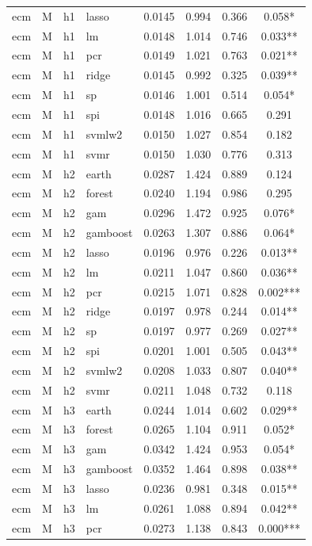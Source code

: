 \begin{ThreePartTable}
\begin{longtable}[t]{llclcccc}
ecm & M & h1 & lasso & 0.0145 & 0.994 & 0.366 & 0.058*\\
ecm & M & h1 & lm & 0.0148 & 1.014 & 0.746 & 0.033**\\
ecm & M & h1 & pcr & 0.0149 & 1.021 & 0.763 & 0.021**\\
ecm & M & h1 & ridge & 0.0145 & 0.992 & 0.325 & 0.039**\\
ecm & M & h1 & sp & 0.0146 & 1.001 & 0.514 & 0.054*\\
ecm & M & h1 & spi & 0.0148 & 1.016 & 0.665 & 0.291\\
ecm & M & h1 & svmlw2 & 0.0150 & 1.027 & 0.854 & 0.182\\
ecm & M & h1 & svmr & 0.0150 & 1.030 & 0.776 & 0.313\\
\addlinespace
ecm & M & h2 & earth & 0.0287 & 1.424 & 0.889 & 0.124\\
ecm & M & h2 & forest & 0.0240 & 1.194 & 0.986 & 0.295\\
ecm & M & h2 & gam & 0.0296 & 1.472 & 0.925 & 0.076*\\
ecm & M & h2 & gamboost & 0.0263 & 1.307 & 0.886 & 0.064*\\
ecm & M & h2 & lasso & 0.0196 & 0.976 & 0.226 & 0.013**\\
ecm & M & h2 & lm & 0.0211 & 1.047 & 0.860 & 0.036**\\
ecm & M & h2 & pcr & 0.0215 & 1.071 & 0.828 & 0.002***\\
ecm & M & h2 & ridge & 0.0197 & 0.978 & 0.244 & 0.014**\\
ecm & M & h2 & sp & 0.0197 & 0.977 & 0.269 & 0.027**\\
ecm & M & h2 & spi & 0.0201 & 1.001 & 0.505 & 0.043**\\
ecm & M & h2 & svmlw2 & 0.0208 & 1.033 & 0.807 & 0.040**\\
ecm & M & h2 & svmr & 0.0211 & 1.048 & 0.732 & 0.118\\
\addlinespace
ecm & M & h3 & earth & 0.0244 & 1.014 & 0.602 & 0.029**\\
ecm & M & h3 & forest & 0.0265 & 1.104 & 0.911 & 0.052*\\
ecm & M & h3 & gam & 0.0342 & 1.424 & 0.953 & 0.054*\\
ecm & M & h3 & gamboost & 0.0352 & 1.464 & 0.898 & 0.038**\\
ecm & M & h3 & lasso & 0.0236 & 0.981 & 0.348 & 0.015**\\
ecm & M & h3 & lm & 0.0261 & 1.088 & 0.894 & 0.042**\\
ecm & M & h3 & pcr & 0.0273 & 1.138 & 0.843 & 0.000***\\

\end{longtable}
\end{ThreePartTable}
